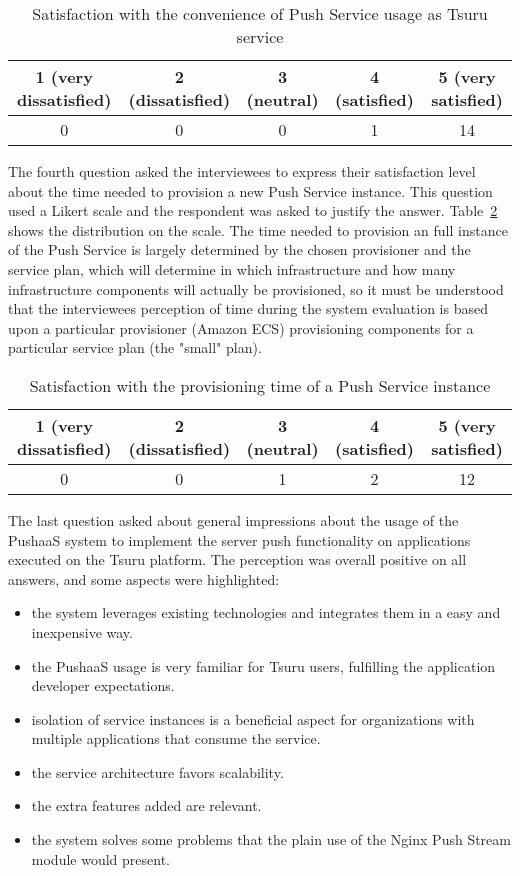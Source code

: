 \begin{table}[h!]
    \centering
    \begin{tabular}{|c|c|c|c|c|}
        \hline
        1 (very dissatisfied) & 2 (dissatisfied) & 3 (neutral) & 4 (satisfied) & 5 (very satisfied) \\
        \hline
        0 & 0 & 0 & 1 & 14 \\
        \hline
    \end{tabular}
    \caption{Satisfaction with the convenience of Push Service usage as Tsuru service}
    \label{table:result-pushaas-1}
\end{table}

The fourth question asked the interviewees to express their satisfaction level about the time needed to provision a new Push Service instance. This question used a Likert scale and the respondent was asked to justify the answer. Table~\ref{table:result-pushaas-2} shows the distribution on the scale. The time needed to provision an full instance of the Push Service is largely determined by the chosen provisioner and the service plan, which will determine in which infrastructure and how many infrastructure components will actually be provisioned, so it must be understood that the interviewees perception of time during the system evaluation is based upon a particular provisioner (Amazon ECS) provisioning components for a particular service plan (the "small" plan).

\begin{table}[h!]
    \centering
    \begin{tabular}{|c|c|c|c|c|}
        \hline
        1 (very dissatisfied) & 2 (dissatisfied) & 3 (neutral) & 4 (satisfied) & 5 (very satisfied) \\
        \hline
        0 & 0 & 1 & 2 & 12 \\
        \hline
    \end{tabular}
    \caption{Satisfaction with the provisioning time of a Push Service instance}
    \label{table:result-pushaas-2}
\end{table}

The last question asked about general impressions about the usage of the PushaaS system to implement the server push functionality on applications executed on the Tsuru platform. The perception was overall positive on all answers, and some aspects were highlighted:
\begin{itemize}
    \item the system leverages existing technologies and integrates them in a easy and inexpensive way.
    \item the PushaaS usage is very familiar for Tsuru users, fulfilling the application developer expectations.
    \item isolation of service instances is a beneficial aspect for organizations with multiple applications that consume the service.
    \item the service architecture favors scalability.
    \item the extra features added are relevant.
    \item the system solves some problems that the plain use of the Nginx Push Stream module would present.
\end{itemize}

